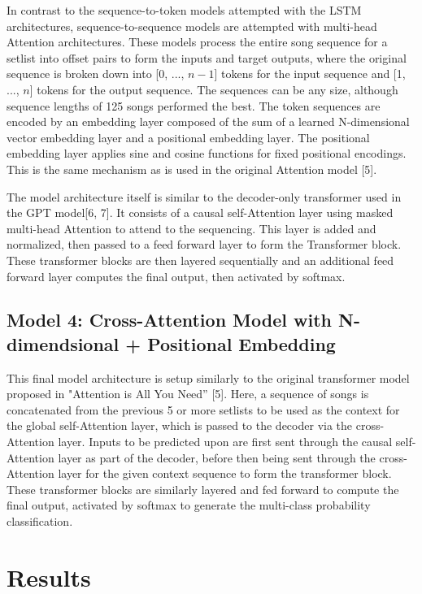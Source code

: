 \documentclass{article}
\begin{document}
In contrast to the sequence-to-token models attempted with the LSTM architectures, sequence-to-sequence models are attempted with multi-head Attention architectures. These models process the entire song sequence for a setlist into offset pairs to form the inputs and target outputs, where the original sequence is broken down into [0, ..., $n-1$] tokens for the input sequence and [1, ..., $n$] tokens for the output sequence. The sequences can be any size, although sequence lengths of 125 songs performed the best. The token sequences are encoded by an embedding layer composed of the sum of a learned N-dimensional vector embedding layer and a positional embedding layer. The positional embedding layer applies sine and cosine functions for fixed positional encodings. This is the same mechanism as is used in the original Attention model [5]. 

The model architecture itself is similar to the decoder-only transformer used in the GPT model[6, 7]. It consists of a causal self-Attention layer using masked multi-head Attention to attend to the sequencing. This layer is added and normalized, then passed to a feed forward layer to form the Transformer block. These transformer blocks are then layered sequentially and an additional feed forward layer computes the final output, then activated by softmax. 

\subsection{Model 4: Cross-Attention Model with N-dimendsional + Positional Embedding}

This final model architecture is setup similarly to the original transformer model proposed in "Attention is All You Need” [5]. Here, a sequence of songs is concatenated from the previous 5 or more setlists to be used as the context for the global self-Attention layer, which is passed to the decoder via the cross-Attention layer. Inputs to be predicted upon are first sent through the causal self-Attention layer as part of the decoder, before then being sent through the cross-Attention layer for the given context sequence to form the transformer block. These transformer blocks are similarly layered and fed forward to compute the final output, activated by softmax to generate the multi-class probability classification. 

\section{Results}
\end{document}

